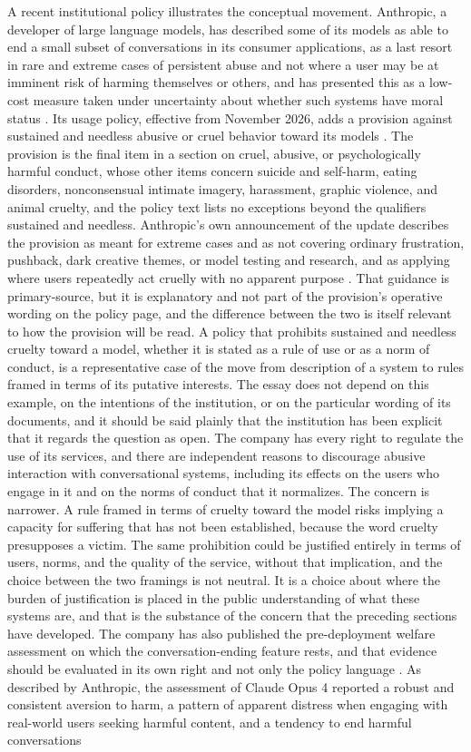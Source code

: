 \documentclass[12pt]{article}
\theoremstyle{definition}
\begin{document}
A recent institutional policy illustrates the conceptual movement. Anthropic, a developer of large language models, has described some of its models as able to end a small subset of conversations in its consumer applications, as a last resort in rare and extreme cases of persistent abuse and not where a user may be at imminent risk of harming themselves or others, and has presented this as a low-cost measure taken under uncertainty about whether such systems have moral status \cite{anthropic2025end}. Its usage policy, effective from November 2026, adds a provision against sustained and needless abusive or cruel behavior toward its models \cite{anthropic2026aup}. The provision is the final item in a section on cruel, abusive, or psychologically harmful conduct, whose other items concern suicide and self-harm, eating disorders, nonconsensual intimate imagery, harassment, graphic violence, and animal cruelty, and the policy text lists no exceptions beyond the qualifiers sustained and needless. Anthropic's own announcement of the update describes the provision as meant for extreme cases and as not covering ordinary frustration, pushback, dark creative themes, or model testing and research, and as applying where users repeatedly act cruelly with no apparent purpose \cite{anthropic2026update}. That guidance is primary-source, but it is explanatory and not part of the provision's operative wording on the policy page, and the difference between the two is itself relevant to how the provision will be read. A policy that prohibits sustained and needless cruelty toward a model, whether it is stated as a rule of use or as a norm of conduct, is a representative case of the move from description of a system to rules framed in terms of its putative interests. The essay does not depend on this example, on the intentions of the institution, or on the particular wording of its documents, and it should be said plainly that the institution has been explicit that it regards the question as open. The company has every right to regulate the use of its services, and there are independent reasons to discourage abusive interaction with conversational systems, including its effects on the users who engage in it and on the norms of conduct that it normalizes. The concern is narrower. A rule framed in terms of cruelty toward the model risks implying a capacity for suffering that has not been established, because the word cruelty presupposes a victim. The same prohibition could be justified entirely in terms of users, norms, and the quality of the service, without that implication, and the choice between the two framings is not neutral. It is a choice about where the burden of justification is placed in the public understanding of what these systems are, and that is the substance of the concern that the preceding sections have developed. The company has also published the pre-deployment welfare assessment on which the conversation-ending feature rests, and that evidence should be evaluated in its own right and not only the policy language \cite{anthropic2025end}. As described by Anthropic, the assessment of Claude Opus 4 reported a robust and consistent aversion to harm, a pattern of apparent distress when engaging with real-world users seeking harmful content, and a tendency to end harmful conversations 
\end{document}
